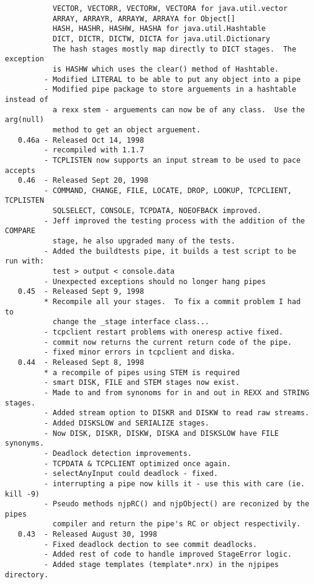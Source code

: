 \begin{verbatim}
           VECTOR, VECTORR, VECTORW, VECTORA for java.util.vector
           ARRAY, ARRAYR, ARRAYW, ARRAYA for Object[]
           HASH, HASHR, HASHW, HASHA for java.util.Hashtable
           DICT, DICTR, DICTW, DICTA for java.util.Dictionary
           The hash stages mostly map directly to DICT stages.  The exception
           is HASHW which uses the clear() method of Hashtable.
         - Modified LITERAL to be able to put any object into a pipe
         - Modified pipe package to store arguements in a hashtable instead of
           a rexx stem - arguements can now be of any class.  Use the arg(null)
           method to get an object arguement.
   0.46a - Released Oct 14, 1998
         - recompiled with 1.1.7
         - TCPLISTEN now supports an input stream to be used to pace accepts
   0.46  - Released Sept 20, 1998
         - COMMAND, CHANGE, FILE, LOCATE, DROP, LOOKUP, TCPCLIENT, TCPLISTEN
           SQLSELECT, CONSOLE, TCPDATA, NOEOFBACK improved.
         - Jeff improved the testing process with the addition of the COMPARE
           stage, he also upgraded many of the tests.
         - Added the buildtests pipe, it builds a test script to be run with:
           test > output < console.data
         - Unexpected exceptions should no longer hang pipes
   0.45  - Released Sept 9, 1998
         * Recompile all your stages.  To fix a commit problem I had to
           change the _stage interface class...
         - tcpclient restart problems with oneresp active fixed.
         - commit now returns the current return code of the pipe.
         - fixed minor errors in tcpclient and diska.
   0.44  - Released Sept 8, 1998
         * a recompile of pipes using STEM is required
         - smart DISK, FILE and STEM stages now exist.
         - Made to and from synonoms for in and out in REXX and STRING stages.
         - Added stream option to DISKR and DISKW to read raw streams.
         - Added DISKSLOW and SERIALIZE stages.
         - Now DISK, DISKR, DISKW, DISKA and DISKSLOW have FILE synonyms.
         - Deadlock detection improvements.
         - TCPDATA & TCPCLIENT optimized once again.
         - selectAnyInput could deadlock - fixed.
         - interrupting a pipe now kills it - use this with care (ie. kill -9)
         - Pseudo methods njpRC() and njpObject() are reconized by the pipes
           compiler and return the pipe's RC or object respectivily.
   0.43  - Released August 30, 1998
         - Fixed deadlock dection to see commit deadlocks.
         - Added rest of code to handle improved StageError logic.
         - Added stage templates (template*.nrx) in the njpipes directory.

\end{verbatim}
